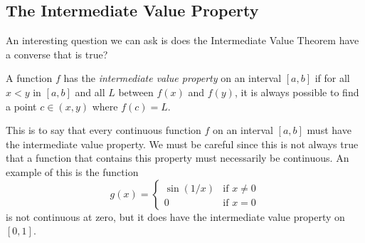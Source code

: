 \subsection{The Intermediate Value Property} 

An interesting question we can ask is does the Intermediate Value Theorem have a converse that is true?

\begin{definition}{}{}
    A function \( f  \) has the \textit{intermediate value property} on an interval \( [a,b] \) if for all \( x < y  \) in \( [a,b] \) and all \( L   \) between \( f(x)  \) and \( f(y) \), it is always possible to find a point \( c \in (x,y) \) where \( f(c) = L  \).
\end{definition}

This is to say that every continuous function \( f \) on an interval \( [a,b] \) must have the intermediate value property. We must be careful since this is not always true that a function that contains this property must necessarily be continuous. An example of this is the function 
\[  g(x) = 
\begin{cases}
    \sin(1/x) &\text{if } x \neq 0 \\
    0 &\text{if } x = 0
\end{cases}  \]
is not continuous at zero, but it does have the intermediate value property on \( [0,1] \). 


